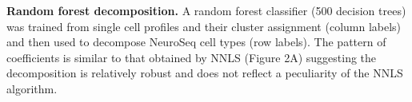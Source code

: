 \textbf{Random forest decomposition. }
A random forest classifier (500 decision trees) was trained from single cell profiles and their cluster assignment (column labels) and then used to decompose NeuroSeq cell types (row labels). The pattern of coefficients is similar to that obtained by NNLS (Figure 2A) suggesting the decomposition is relatively robust and does not reflect a peculiarity of the NNLS algorithm.
